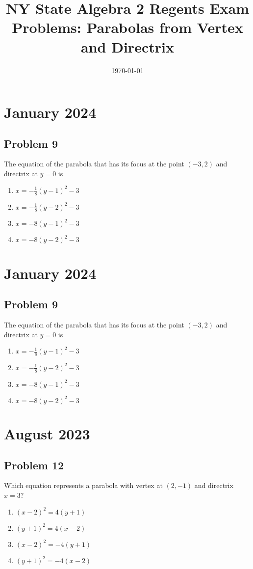 \documentclass{article}
\begin{document}
\title{NY State Algebra 2 Regents Exam Problems: Parabolas from Vertex and Directrix}
\author{}
\date{\today}
\maketitle

\section*{January 2024}
\subsection*{Problem 9}
The equation of the parabola that has its focus at the point $(-3, 2)$ and directrix at $y = 0$ is
\begin{enumerate}
    \item $x = -\frac{1}{8}(y-1)^2 - 3$
    \item $x = -\frac{1}{8}(y-2)^2 - 3$
    \item $x = -8(y-1)^2 - 3$
    \item $x = -8(y-2)^2 - 3$
\end{enumerate}

\section*{January 2024}
\subsection*{Problem 9}
The equation of the parabola that has its focus at the point $(-3, 2)$ and directrix at $y = 0$ is
\begin{enumerate}
    \item $x = -\frac{1}{8}(y-1)^2 - 3$
    \item $x = -\frac{1}{8}(y-2)^2 - 3$
    \item $x = -8(y-1)^2 - 3$
    \item $x = -8(y-2)^2 - 3$
\end{enumerate}

\section*{August 2023}
\subsection*{Problem 12}
Which equation represents a parabola with vertex at $(2, -1)$ and directrix $x = 3$?
\begin{enumerate}
    \item $(x-2)^2 = 4(y+1)$
    \item $(y+1)^2 = 4(x-2)$
    \item $(x-2)^2 = -4(y+1)$
    \item $(y+1)^2 = -4(x-2)$
\end{enumerate}
\end{document}
